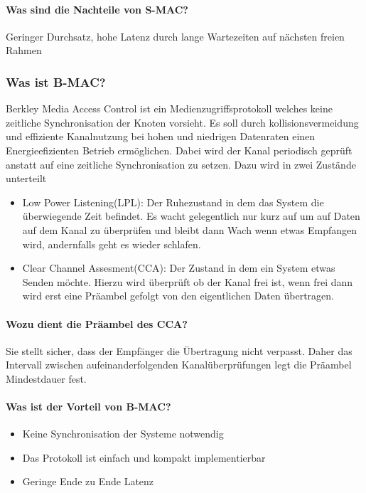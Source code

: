 	\paragraph{Was sind die Nachteile von S-MAC?}
	Geringer Durchsatz, hohe Latenz durch lange Wartezeiten auf nächsten freien Rahmen
	
	
	
	\subsubsection{Was ist B-MAC?}
	Berkley Media Access Control ist ein Medienzugriffsprotokoll welches keine zeitliche Synchronisation der Knoten vorsieht. Es soll durch kollisionsvermeidung und effiziente Kanalnutzung bei hohen und niedrigen Datenraten einen Energieefizienten Betrieb ermöglichen. Dabei wird der Kanal periodisch geprüft anstatt auf eine zeitliche Synchronisation zu setzen. Dazu wird in zwei Zustände unterteilt
	\begin{itemize}
		\item Low Power Listening(LPL): Der Ruhezustand in dem das System die überwiegende Zeit befindet. Es wacht gelegentlich nur kurz auf um auf Daten auf dem Kanal zu überprüfen und bleibt dann Wach wenn etwas Empfangen wird, andernfalls geht es wieder schlafen.
		\item Clear Channel Assesment(CCA): Der Zustand in dem ein System etwas Senden möchte. Hierzu wird überprüft ob der Kanal frei ist, wenn frei dann wird erst eine Präambel gefolgt von den eigentlichen Daten übertragen.
	\end{itemize}
	
	\paragraph{Wozu dient die Präambel des CCA?}
	Sie stellt sicher, dass der Empfänger die Übertragung nicht verpasst. Daher das Intervall zwischen aufeinanderfolgenden Kanalüberprüfungen legt die Präambel Mindestdauer fest.
	
	\paragraph{Was ist der Vorteil von B-MAC?}
	\begin{itemize}
		\item Keine Synchronisation der Systeme notwendig
		\item Das Protokoll ist einfach und kompakt implementierbar
		\item Geringe Ende zu Ende Latenz
	\end{itemize}
